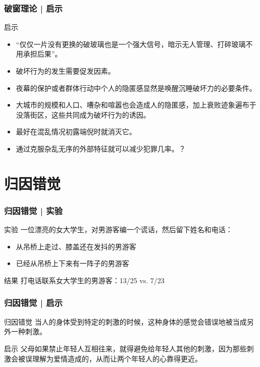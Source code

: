 \begin{frame}
  \frametitle{破窗理论 | 启示}
  \begin{block}{启示}
    \begin{itemize}
      \item “仅仅一片没有更换的破玻璃也是一个强大信号，暗示无人管理、打碎玻璃不用承担后果”。
      \item 破坏行为的发生需要促发因素。
      \item 夜幕的保护或者群体行动中个人的隐匿感显然是唤醒沉睡破坏力的必要条件。
      \item 大城市的规模和人口、嘈杂和喧嚣也会造成人的隐匿感，加上衰败迹象遍布于没落街区，这些共同成为破坏行为的诱因。
      \item 最好在混乱情况初露端倪时就消灭它。
      \item 通过克服杂乱无序的外部特征就可以减少犯罪几率。？
    \end{itemize}
  \end{block}
\end{frame}

\section{归因错觉}
\begin{frame}
  \frametitle{归因错觉 | 实验}
  \begin{block}{实验}
    一位漂亮的女大学生，对男游客编一个谎话，然后留下姓名和电话：
    \begin{itemize}
      \item 从吊桥上走过、膝盖还在发抖的男游客
      \item 已经从吊桥上下来有一阵子的男游客
    \end{itemize}
  \end{block}
  \pause
  \begin{block}{结果}
    打电话联系女大学生的男游客：13/25 vs. 7/23
  \end{block}
\end{frame}

\begin{frame}
  \frametitle{归因错觉 | 启示}
  \begin{block}{归因错觉}
    当人的身体受到特定的刺激的时候，这种身体的感觉会错误地被当成另外一种刺激。
  \end{block}
  \pause
  \begin{block}{启示}
父母如果禁止年轻人互相往来，就得避免给年轻人其他的刺激，因为那些刺激会被误理解为爱情造成的，从而让两个年轻人的心靠得更近。
  \end{block}
\end{frame}

